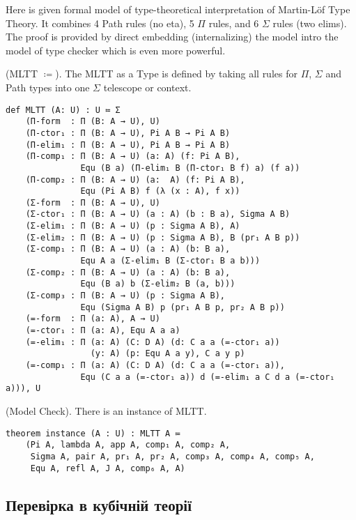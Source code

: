 Here is given formal model of type-theoretical interpretation of Martin-Löf Type Theory.
It combines 4 Path rules (no eta), 5 $\Pi$ rules, and 6 $\Sigma$ rules (two elims).
The proof is provided by direct embedding (internalizing) the model intro the model
of type checker which is even more powerful.

\begin{definition} (MLTT $≔$).
The MLTT as a Type is defined by taking all rules
for $\Pi$, $\Sigma$ and Path types into one $\Sigma$ telescope or context.
\end{definition}

\begin{lstlisting}
def MLTT (A: U) : U ≔ Σ
    (Π-form  : Π (B: A → U), U)
    (Π-ctor₁ : Π (B: A → U), Pi A B → Pi A B)
    (Π-elim₁ : Π (B: A → U), Pi A B → Pi A B)
    (Π-comp₁ : Π (B: A → U) (a: A) (f: Pi A B),
               Equ (B a) (Π-elim₁ B (Π-ctor₁ B f) a) (f a))
    (Π-comp₂ : Π (B: A → U) (a:  A) (f: Pi A B),
               Equ (Pi A B) f (λ (x : A), f x))
    (Σ-form  : Π (B: A → U), U)
    (Σ-ctor₁ : Π (B: A → U) (a : A) (b : B a), Sigma A B)
    (Σ-elim₁ : Π (B: A → U) (p : Sigma A B), A)
    (Σ-elim₂ : Π (B: A → U) (p : Sigma A B), B (pr₁ A B p))
    (Σ-comp₁ : Π (B: A → U) (a : A) (b: B a),
               Equ A a (Σ-elim₁ B (Σ-ctor₁ B a b)))
    (Σ-comp₂ : Π (B: A → U) (a : A) (b: B a),
               Equ (B a) b (Σ-elim₂ B (a, b)))
    (Σ-comp₃ : Π (B: A → U) (p : Sigma A B),
               Equ (Sigma A B) p (pr₁ A B p, pr₂ A B p))
    (=-form  : Π (a: A), A → U)
    (=-ctor₁ : Π (a: A), Equ A a a)
    (=-elim₁ : Π (a: A) (C: D A) (d: C a a (=-ctor₁ a))
                 (y: A) (p: Equ A a y), C a y p)
    (=-comp₁ : Π (a: A) (C: D A) (d: C a a (=-ctor₁ a)),
               Equ (C a a (=-ctor₁ a)) d (=-elim₁ a C d a (=-ctor₁ a))), U
\end{lstlisting}

\begin{theorem} (Model Check).
There is an instance of MLTT.
\begin{lstlisting}
theorem instance (A : U) : MLTT A ≔
    (Pi A, lambda A, app A, comp₁ A, comp₂ A,
     Sigma A, pair A, pr₁ A, pr₂ A, comp₃ A, comp₄ A, comp₅ A,
     Equ A, refl A, J A, comp₆ A, A)
\end{lstlisting}
\end{theorem}

\newpage
\subsection*{Перевірка в кубічній теорії}

